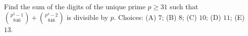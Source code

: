 Find the sum of the digits of the unique prime $p\ge31$ such that $\binom{p^2-1}{846}+\binom{p^2-2}{846}$ is divisible by $p$. Choices: (A) $7$; (B) $8$; (C) $10$; (D) $11$; (E) $13$.
